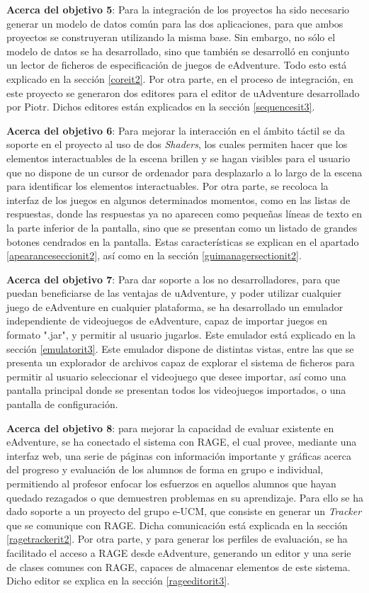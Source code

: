 \textbf{Acerca del objetivo 5}: Para la integración de los proyectos ha sido necesario generar un modelo de datos común para las dos aplicaciones, para que ambos proyectos se construyeran utilizando la misma base. Sin embargo, no sólo el modelo de datos se ha desarrollado, sino que también se desarrolló en conjunto un lector de ficheros de especificación de juegos de eAdventure. Todo esto está explicado en la sección \ref{coreit2}. Por otra parte, en el proceso de integración, en este proyecto se generaron dos editores para el editor de uAdventure desarrollado por Piotr. Dichos editores están explicados en la sección \ref{sequencesit3}.

\textbf{Acerca del objetivo 6}: Para mejorar la interacción en el ámbito táctil se da soporte en el proyecto al uso de dos \textit{Shaders}, los cuales permiten hacer que los elementos interactuables de la escena brillen y se hagan visibles para el usuario que no dispone de un cursor de ordenador para desplazarlo a lo largo de la escena para identificar los elementos interactuables. Por otra parte, se recoloca la interfaz de los juegos en algunos determinados momentos, como en las listas de respuestas, donde las respuestas ya no aparecen como pequeñas líneas de texto en la parte inferior de la pantalla, sino que se presentan como un listado de grandes botones cendrados en la pantalla. Estas características se explican en el apartado \ref{apearanceseccionit2}, así como en la sección \ref{guimanagersectionit2}.

\textbf{Acerca del objetivo 7}: Para dar soporte a los no desarrolladores, para que puedan beneficiarse de las ventajas de uAdventure, y poder utilizar cualquier juego de eAdventure en cualquier plataforma, se ha desarrollado un emulador independiente de videojuegos de eAdventure, capaz de importar juegos en formato ".jar", y permitir al usuario jugarlos. Este emulador está explicado en la sección \ref{emulatorit3}. Este emulador dispone de distintas vistas, entre las que se presenta un explorador de archivos capaz de explorar el sistema de ficheros para permitir al usuario seleccionar el videojuego que desee importar, así como una pantalla principal donde se presentan todos los videojuegos importados, o una pantalla de configuración.

\textbf{Acerca del objetivo 8}: para mejorar la capacidad de evaluar existente en eAdventure, se ha conectado el sistema con RAGE, el cual provee, mediante una interfaz web, una serie de páginas con información importante y gráficas acerca del progreso y evaluación de los alumnos de forma en grupo e individual, permitiendo al profesor enfocar los esfuerzos en aquellos alumnos que hayan quedado rezagados o que demuestren problemas en su aprendizaje. Para ello se ha dado soporte a un proyecto del grupo e-UCM, que consiste en generar un \textit{Tracker} que se comunique con RAGE. Dicha comunicación está explicada en la sección \ref{ragetrackerit2}. Por otra parte, y para generar los perfiles de evaluación, se ha facilitado el acceso a RAGE desde eAdventure, generando un editor y una serie de clases comunes con RAGE, capaces de almacenar elementos de este sistema. Dicho editor se explica en la sección \ref{rageeditorit3}.


